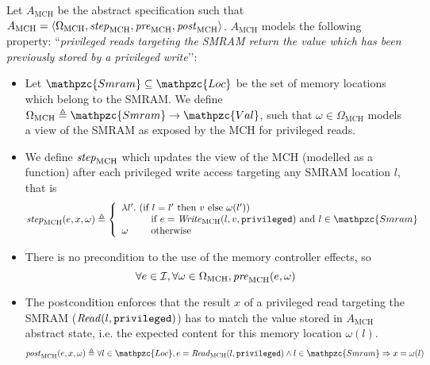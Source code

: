 \begin{example} \label{ex:mch-abs-specs} Let $A_{\mathrm{MCH}}$ be the abstract
  specification such that
  $A_{\mathrm{MCH}} = \langle \Omega_{\mathrm{MCH}}, \mathit{step}_{\mathrm{MCH}},
  \mathit{pre}_{\mathrm{MCH}}, \mathit{post}_{\mathrm{MCH}} \rangle$.
  $A_{\mathrm{MCH}}$ models the following property: ``\emph{privileged reads
    targeting the SMRAM return the value which has been previously stored by a
    privileged write}’’:
  \begin{itemize}
  \item Let $\mathpzc{Smram} \subseteq \mathpzc{Loc}$ be the set of memory
    locations which belong to the SMRAM.  We define
    $\Omega_{\mathrm{MCH}} \triangleq \mathpzc{Smram} \rightarrow
    \mathpzc{Val}$, such that $\omega \in \Omega_{\mathrm{MCH}}$ models a view
    of the SMRAM as exposed by the MCH for privileged reads.
  \item We define $\mathit{step}_{\mathrm{MCH}}$ which updates the view of the MCH
    (modelled as a function) after each privileged write access targeting any
    SMRAM location $l$, that is
    \[ \func{step}_{\mathrm{MCH}}(e, x, \omega) \triangleq \left\{
        \begin{array}{l}
          \lambda l'.  \text{ (if } l = l' \text{ then } v \text{ else } \omega(l')) \\
          \qquad\ \ \text{ if } e = \func{Write}_{\mathrm{MCH}}(l, v, \val{privileged})
          \text{ and } l \in \mathpzc{Smram} \\
          \omega \qquad \text{ otherwise}
        \end{array}
      \right.
    \]
  \item There is no precondition to the use of the memory controller effects, so
    \[ \forall e \in \mathcal{I},\forall \omega \in \Omega_{\mathrm{MCH}},
      \mathit{pre}_{\mathrm{MCH}}(e, \omega) \]
  \item The postcondition enforces that the result $x$ of a privileged read
    targeting the SMRAM ($\mathit{Read}(l, \mathtt{privileged})$) has to match the
    value stored in $A_{\mathrm{MCH}}$ abstract state, i.e. the expected content
    for this memory location $\omega(l)$.
    \[ \func{post}_{\mathrm{MCH}}(e, x, \omega) \triangleq \forall l \in
      \mathpzc{Loc}, e = \func{Read}_{\mathrm{MCH}}(l, \val{privileged}) \wedge
      l \in \mathpzc{Smram} \Rightarrow x = \omega(l)
    \]
  \end{itemize}
\end{example}

